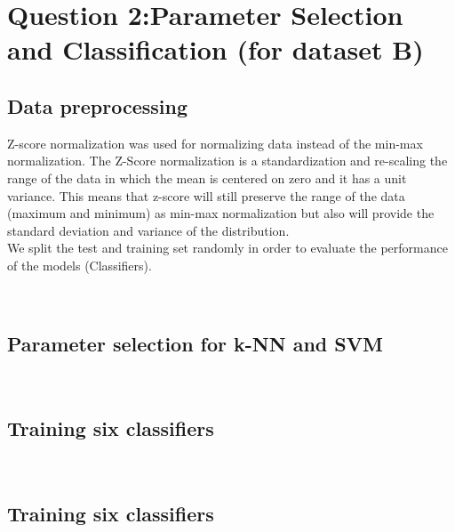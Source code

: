 \section{Question 2:Parameter Selection and Classification (for dataset B)}
\subsection{Data preprocessing}
Z-score normalization was used for normalizing data instead of the min-max normalization. The Z-Score normalization is a standardization and re-scaling the range of the data in
which the mean is centered on zero and it has a unit variance. This means that z-score will still preserve the range of the data (maximum and minimum) as min-max normalization but also will provide the standard deviation and variance of the distribution. \\
We split the test and training set randomly in order to evaluate the performance of the models (Classifiers). 




\\
\subsection{Parameter selection for k-NN and SVM}



\\
\subsection{Training six classifiers}



\\
\subsection{Training six classifiers}




